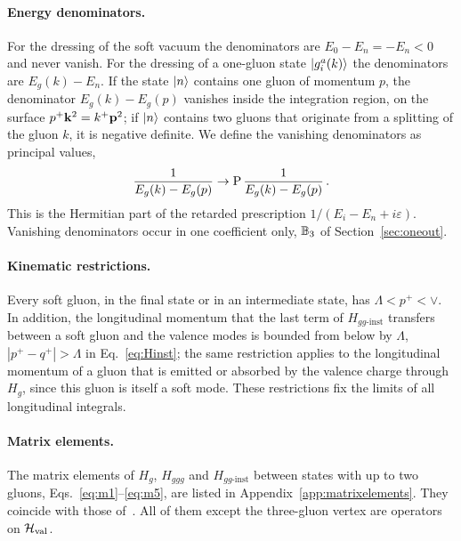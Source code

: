 \paragraph{Energy denominators.} For the dressing of the soft vacuum the denominators are $E_0-E_n=-E_n<0$ and never vanish. For the dressing of a one-gluon state $\ket{g^a_i(k)}$ the denominators are $E_g(k)-E_n$. If the state $\ket n$ contains one gluon of momentum $p$, the denominator $E_g(k)-E_g(p)$ vanishes inside the integration region, on the surface $p^+\mathbf{k}^2=k^+\mathbf{p}^2$; if $\ket n$ contains two gluons that originate from a splitting of the gluon $k$, it is negative definite. We define the vanishing denominators as principal values,
\begin{align}\label{eq:PV}
\frac{1}{E_g(k)-E_g(p)}\to\mathrm{P}\,\frac{1}{E_g(k)-E_g(p)}\,.
\end{align}
This is the Hermitian part of the retarded prescription $1/(E_i-E_n+i\varepsilon)$. Vanishing denominators occur in one coefficient only, $\mathbb{B}_3$ of Section~\ref{sec:oneout}.


\paragraph{Kinematic restrictions.} Every soft gluon, in the final state or in an intermediate state, has $\Lambda<p^+<\vee$. In addition, the longitudinal momentum that the last term of $H_{gg\text{-inst}}$ transfers between a soft gluon and the valence modes is bounded from below by $\Lambda$, $|p^+-q^+|>\Lambda$ in Eq.~\eqref{eq:Hinst}; the same restriction applies to the longitudinal momentum of a gluon that is emitted or absorbed by the valence charge through $H_g$, since this gluon is itself a soft mode. These restrictions fix the limits of all longitudinal integrals.

\paragraph{Matrix elements.} The matrix elements of $H_g$, $H_{ggg}$ and $H_{gg\text{-inst}}$ between states with up to two gluons, Eqs.~\eqref{eq:m1}--\eqref{eq:m5}, are listed in Appendix~\ref{app:matrixelements}. They coincide with those of~\cite{Lublinsky:2016meo}. All of them except the three-gluon vertex are operators on $\mathcal H_{\rm val}$.


